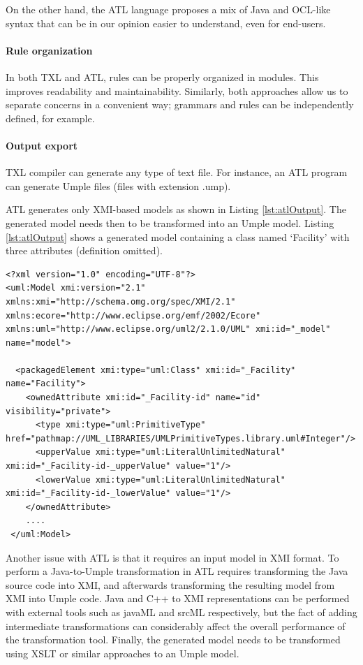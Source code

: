 On the other hand, the ATL language proposes a mix of Java and OCL-like syntax that can be in our opinion easier to understand, even for end-users. 

\paragraph*{Rule organization}

In both TXL and ATL, rules can be properly organized in modules. This improves readability and maintainability.
Similarly, both approaches allow us to separate concerns in a convenient way; grammars and rules can be independently defined, for example.

\paragraph*{Output export} 

TXL compiler can generate any type of text file. For instance, an ATL program can generate Umple files (files with extension .ump).

ATL generates only XMI-based models as shown in Listing \ref{lst:atlOutput}. The generated model needs then to be transformed into an Umple model. Listing \ref{lst:atlOutput} shows a generated model containing a class named `Facility' with three attributes (definition omitted).

\begin{lstlisting}[style=umplePlain, label=lst:atlOutput, caption=Model generated by ATL] 
<?xml version="1.0" encoding="UTF-8"?>
<uml:Model xmi:version="2.1" xmlns:xmi="http://schema.omg.org/spec/XMI/2.1" xmlns:ecore="http://www.eclipse.org/emf/2002/Ecore" xmlns:uml="http://www.eclipse.org/uml2/2.1.0/UML" xmi:id="_model" name="model">

  <packagedElement xmi:type="uml:Class" xmi:id="_Facility" name="Facility">
    <ownedAttribute xmi:id="_Facility-id" name="id" visibility="private">
      <type xmi:type="uml:PrimitiveType" href="pathmap://UML_LIBRARIES/UMLPrimitiveTypes.library.uml#Integer"/>
      <upperValue xmi:type="uml:LiteralUnlimitedNatural" xmi:id="_Facility-id-_upperValue" value="1"/>
      <lowerValue xmi:type="uml:LiteralUnlimitedNatural" xmi:id="_Facility-id-_lowerValue" value="1"/>
    </ownedAttribute>
    ....
 </uml:Model>     
\end{lstlisting}

Another issue with ATL is that it requires an input model in  XMI format. To perform a Java-to-Umple transformation in ATL requires transforming the Java source code into XMI, and afterwards transforming the resulting model from XMI into Umple code. Java and C++ to XMI representations can be performed with external tools such as javaML and srcML respectively, but the fact of adding intermediate transformations can considerably affect the overall performance of the transformation tool. Finally, the generated model needs to be transformed using XSLT or similar approaches to an Umple model.

